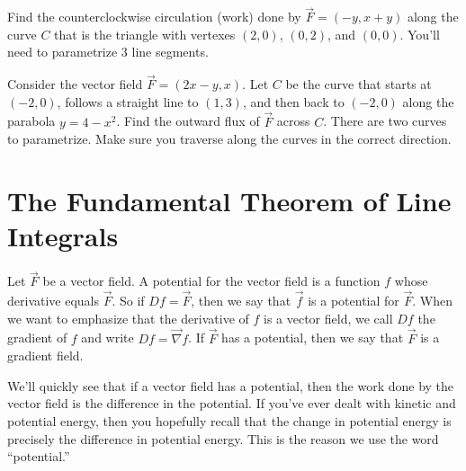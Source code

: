 \begin{problem}
%
Find the counterclockwise circulation (work) done by $\vec F=(-y,x+y)$ along the curve $C$ that is the triangle with vertexes  $(2,0)$, $(0,2)$, and $(0,0)$.  You'll need to parametrize 3 line segments. 
\end{problem}

\begin{problem}
 Consider the vector field $\vec F=(2x-y,x)$. Let $C$ be the curve that starts at $(-2,0)$, follows a straight line to $(1,3)$, and then back to $(-2,0)$ along the parabola $y=4-x^2$.  Find the outward flux of $\vec F$ across $C$. There are two curves to parametrize. Make sure you traverse along the curves in the correct direction.
\end{problem}

\section{The Fundamental Theorem of Line Integrals}

\begin{definition}
%
 Let $\vec F$ be a vector field.  A potential for the vector field is a function $f$ whose derivative equals $\vec F$. So if $Df=\vec F$, then we say that $\vec f$ is a potential for $\vec F$. When we want to emphasize that the derivative of $f$ is a vector field, we call $Df$ the gradient of $f$ and write $Df = \vec \nabla f$.
 If $\vec F$ has a potential, then we say that $\vec F$ is a gradient field. 
\end{definition}

We'll quickly see that if a vector field has a potential, then the work done by the vector field is the difference in the potential.  If you've ever dealt with kinetic and potential energy, then you hopefully recall that the change in potential energy is precisely the difference in potential energy.  This is the reason we use the word ``potential.''

